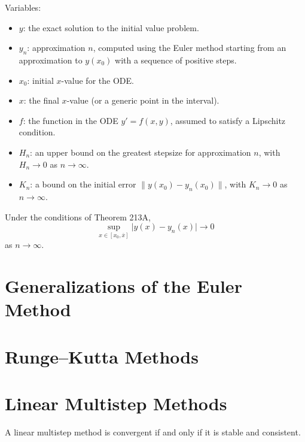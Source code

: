 Variables:
\begin{itemize}
    \item \(y\): the exact solution to the initial value problem.
    \item \(y_n\): approximation \(n\), computed using the Euler method starting from an approximation to \(y(x_0)\) with a sequence of positive steps.
    \item \(x_0\): initial \(x\)-value for the ODE.
    \item \(x\): the final \(x\)-value (or a generic point in the interval).
    \item \(f\): the function in the ODE \(y' = f(x, y)\), assumed to satisfy a Lipschitz condition.
    \item \(H_n\): an upper bound on the greatest stepsize for approximation \(n\), with \(H_n \to 0\) as \(n \to \infty\).
    \item \(K_n\): a bound on the initial error \(\|y(x_0) - y_n(x_0)\|\), with \(K_n \to 0\) as \(n \to \infty\).
\end{itemize}

\begin{theorem}

  \label{thm:213B}
Under the conditions of Theorem 213A,
\[
\sup_{x\in[x_0,\overline{x}]} \bigl| y(x) - y_n(x) \bigr| \to 0
\]
as $n \to \infty$.
\end{theorem}

\section{Generalizations of the Euler Method}


\section{Runge–Kutta Methods}


\section{Linear Multistep Methods}

\begin{theorem}

  \label{thm:243A}
A linear multistep method is convergent if and only if it is stable and consistent.
\end{theorem}

